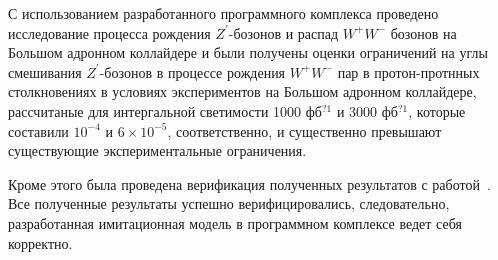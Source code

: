 С использованием разработанного программного комплекса проведено исследование процесса рождения ${Z}^{\prime}$-бозонов и распад ${W}^{+}{W}^{-}$ бозонов на Большом адронном коллайдере и были получены оценки ограничений на углы смешивания ${Z}^{\prime}$-бозонов в
процессе рождения ${W}^{+}$${W}^{-}$ пар в протон-протнных столкновениях
в условиях экспериментов на Большом адронном коллайдере, рассчитаные для интергальной светимости 1000 фб${}^{?1}$ и 3000 фб${}^{?1}$, которые составили  ${10}^{-4}$ и $6\times{10}^{-5}$, соответственно, и существенно превышают существующие экспериментальные ограничения.

Кроме этого была проведена верификация полученных результатов с
работой~\cite{2part-pankov}. Все полученные результаты успешно верифицировались,
следовательно, разработанная имитационная модель в программном комплексе
ведет себя корректно.